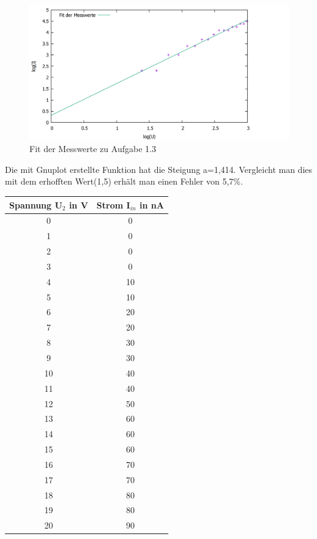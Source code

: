 \begin{figure}
	\includegraphics[width=\textwidth]{../Daten/Aufgabe1/Aufgabe1_3.png}
	\caption{Fit der Messwerte zu Aufgabe 1.3}
\end{figure}
Die mit Gnuplot erstellte Funktion hat die Steigung a=1,414. Vergleicht man dies mit dem erhofften Wert(1,5) erhält man einen Fehler von 5,7\%.
\begin{center}
	\begin{tabular}{|c|c|}
		\hline
		Spannung U$_2$ in V & Strom I$_{in}$ in nA \\ \hline
		0          &          0           \\ \hline
		1          &          0           \\ \hline
		2          &          0           \\ \hline
		3          &          0           \\ \hline
		4          &          10          \\ \hline
		5          &          10          \\ \hline
		6          &          20          \\ \hline
		7          &          20          \\ \hline
		8          &          30          \\ \hline
		9          &          30          \\ \hline
		10          &          40          \\ \hline
		11          &          40          \\ \hline
		12          &          50          \\ \hline
		13          &          60          \\ \hline
		14          &          60          \\ \hline
		15          &          60          \\ \hline
		16          &          70          \\ \hline
		17          &          70          \\ \hline
		18          &          80          \\ \hline
		19          &          80          \\ \hline
		20          &          90          \\ \hline
	\end{tabular} 
\end{center}
